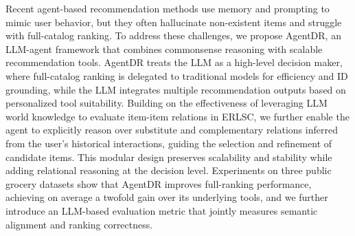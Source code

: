 Recent agent-based recommendation methods use memory and prompting to mimic user behavior, but they often hallucinate non-existent items and struggle with full-catalog ranking. To address these challenges, we propose AgentDR, an LLM-agent framework that combines commonsense reasoning with scalable recommendation tools. AgentDR treats the LLM as a high-level decision maker, where full-catalog ranking is delegated to traditional models for efficiency and ID grounding, while the LLM integrates multiple recommendation outputs based on personalized tool suitability. Building on the effectiveness of leveraging LLM world knowledge to evaluate item-item relations in ERLSC, we further enable the agent to explicitly reason over substitute and complementary relations inferred from the user's historical interactions, guiding the selection and refinement of candidate items. This modular design preserves scalability and stability while adding relational reasoning at the decision level. Experiments on three public grocery datasets show that AgentDR improves full-ranking performance, achieving on average a twofold gain over its underlying tools, and we further introduce an LLM-based evaluation metric that jointly measures semantic alignment and ranking correctness.
